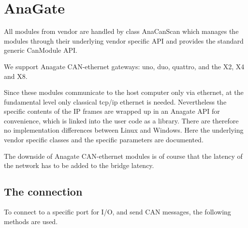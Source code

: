 \documentclass[letterpaper,10pt,english]{sphinxmanual}
\begin{document}
\chapter{AnaGate}
\label{\detokenize{vendors/anagate:anagate}}\label{\detokenize{vendors/anagate::doc}}
All modules from vendor {\hyperref[\detokenize{vendors/anagate:anagate}]{}} are handled by class AnaCanScan which manages the modules through their underlying vendor specific API and provides
the standard generic CanModule API.

We support Anagate CAN-ethernet gateways: uno, duo, quattro, and the X2, X4 and X8.

Since these modules communicate to the host computer only via ethernet, at the fundamental level only classical
tcp/ip ethernet is needed. Nevertheless the specific contents of the IP frames are wrapped up in an Anagate API for convenience, which is linked
into the user code as a library. There are therefore no implementation differences between Linux and Windows.
Here the underlying vendor specific classes and the specific parameters are documented.

The downside of Anagate CAN-ethernet modules is of course that the latency of the network has to be added to the bridge latency.


\section{The connection}
\label{\detokenize{vendors/anagate:the-connection}}
To connect to a specific port for I/O, and send CAN messages, the following methods are used.
\end{document}
